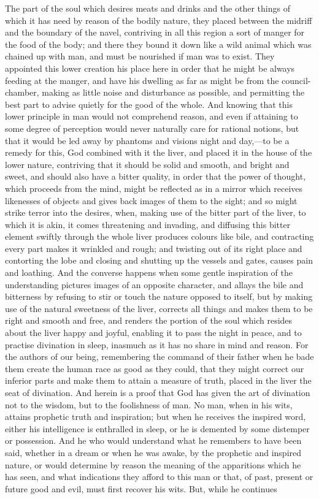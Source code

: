 \documentclass[11pt,letter]{article}
\begin{document}
\par  The part of the soul which desires meats and drinks and the other things of which it has need by reason of the bodily nature, they placed between the midriff and the boundary of the navel, contriving in all this region a sort of manger for the food of the body; and there they bound it down like a wild animal which was chained up with man, and must be nourished if man was to exist. They appointed this lower creation his place here in order that he might be always feeding at the manger, and have his dwelling as far as might be from the council-chamber, making as little noise and disturbance as possible, and permitting the best part to advise quietly for the good of the whole. And knowing that this lower principle in man would not comprehend reason, and even if attaining to some degree of perception would never naturally care for rational notions, but that it would be led away by phantoms and visions night and day,—to be a remedy for this, God combined with it the liver, and placed it in the house of the lower nature, contriving that it should be solid and smooth, and bright and sweet, and should also have a bitter quality, in order that the power of thought, which proceeds from the mind, might be reflected as in a mirror which receives likenesses of objects and gives back images of them to the sight; and so might strike terror into the desires, when, making use of the bitter part of the liver, to which it is akin, it comes threatening and invading, and diffusing this bitter element swiftly through the whole liver produces colours like bile, and contracting every part makes it wrinkled and rough; and twisting out of its right place and contorting the lobe and closing and shutting up the vessels and gates, causes pain and loathing. And the converse happens when some gentle inspiration of the understanding pictures images of an opposite character, and allays the bile and bitterness by refusing to stir or touch the nature opposed to itself, but by making use of the natural sweetness of the liver, corrects all things and makes them to be right and smooth and free, and renders the portion of the soul which resides about the liver happy and joyful, enabling it to pass the night in peace, and to practise divination in sleep, inasmuch as it has no share in mind and reason. For the authors of our being, remembering the command of their father when he bade them create the human race as good as they could, that they might correct our inferior parts and make them to attain a measure of truth, placed in the liver the seat of divination. And herein is a proof that God has given the art of divination not to the wisdom, but to the foolishness of man. No man, when in his wits, attains prophetic truth and inspiration; but when he receives the inspired word, either his intelligence is enthralled in sleep, or he is demented by some distemper or possession. And he who would understand what he remembers to have been said, whether in a dream or when he was awake, by the prophetic and inspired nature, or would determine by reason the meaning of the apparitions which he has seen, and what indications they afford to this man or that, of past, present or future good and evil, must first recover his wits. But, while he continues 
\end{document}
